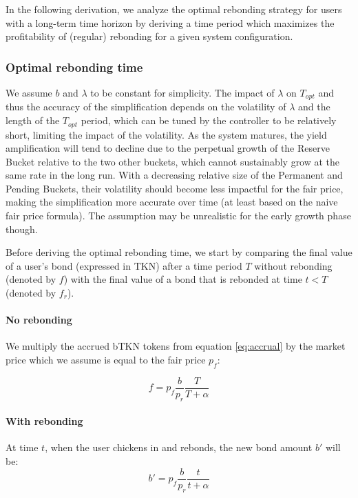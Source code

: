 \documentclass{article}
\begin{document}
In the following derivation, we analyze the optimal rebonding strategy for users with a long-term time horizon by deriving a time period which maximizes the profitability of (regular) rebonding for a given system configuration.

\subsubsection{Optimal rebonding time}
  \label{sec:T_OP}
We assume $b$ and $\lambda$ to be constant for simplicity. The impact of $\lambda$ on $T_{opt}$ and thus the accuracy of the simplification depends on the volatility of $\lambda$ and the length of the $T_{opt}$ period, which can be tuned by the controller to be relatively short, limiting the impact of the volatility. As the system matures, the yield amplification will tend to decline due to the perpetual growth of the Reserve Bucket relative to the two other buckets, which cannot sustainably grow at the same rate in the long run. With a decreasing relative size of the Permanent and Pending Buckets, their volatility should become less impactful for the fair price, making the simplification more accurate over time (at least based on the naive fair price formula). The assumption may be unrealistic for the early growth phase though.

Before deriving the optimal rebonding time, we start by comparing the final value of a user's bond (expressed in TKN) after a time period $T$ without rebonding (denoted by $f$) with the final value of a bond that is rebonded at time $t<T$ (denoted by $f_r$).

\paragraph{No rebonding}
We multiply the accrued bTKN tokens from equation \ref{eq:accrual} by the market price which we assume is equal to the fair price $p_f$:

\begin{equation}
  \label{eq:o-s}
f = p_f\frac{b}{p_r}\frac{T}{T+\alpha}
\end{equation}

\paragraph{With rebonding}
At time $t$, when the user chickens in and rebonds, the new bond amount $b'$ will be:
\begin{equation}
b'= p_f\frac{b}{p_r}\frac{t}{t+\alpha}
\end{equation}
\end{document}
